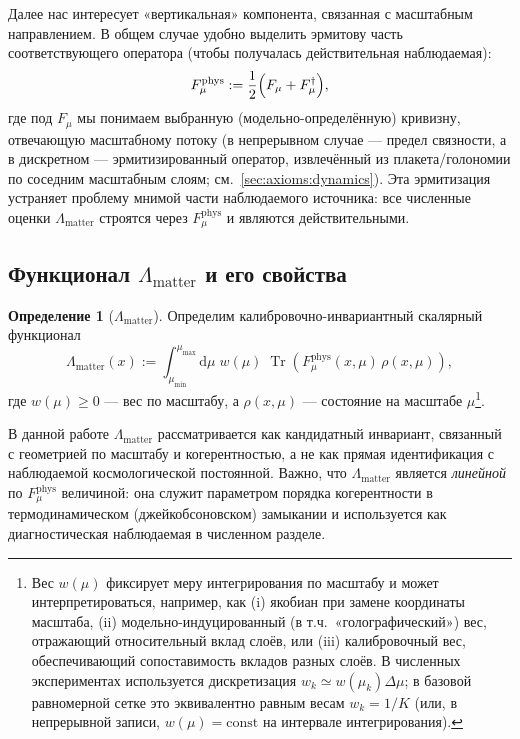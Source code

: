 \documentclass[11pt,a4paper]{article}
\DeclareMathOperator{\Tr}{Tr}
\newcommand{\dd}{\mathrm{d}}
\theoremstyle{definition}
\newtheorem{definition}{Определение}[section]
\theoremstyle{plain}
\theoremstyle{remark}
\begin{document}
Далее нас интересует «вертикальная» компонента, связанная с масштабным направлением.
В общем случае удобно выделить эрмитову часть соответствующего оператора (чтобы получалась действительная наблюдаемая):
\begin{equation}\label{eq:Fphys_def}
F_{\mu}^{\mathrm{phys}} := \frac{1}{2}\Bigl(F_{\mu}+F_{\mu}^\dagger\Bigr),
\end{equation}
где под $F_\mu$ мы понимаем выбранную (модельно-определённую) кривизну, отвечающую масштабному потоку
(в непрерывном случае --- предел связности, а в дискретном --- эрмитизированный оператор,
извлечённый из плакета/голономии по соседним масштабным слоям; см.\ \cref{sec:axioms:dynamics}).
Эта эрмитизация устраняет проблему мнимой части наблюдаемого источника:
все численные оценки $\Lambda_{\mathrm{matter}}$ строятся через $F_{\mu}^{\mathrm{phys}}$ и являются действительными.

\subsection[Функционал Lambda\_matter и его свойства]{Функционал $\Lambda_{\mathrm{matter}}$ и его свойства}
\label{sec:theory:Lambdadef}

\begin{definition}[$\Lambda_{\mathrm{matter}}$]\label{def:Lambdamatter}
Определим калибровочно-инвариантный скалярный функционал
\begin{equation}\label{eq:Lambdamatter_def}
\Lambda_{\mathrm{matter}}(x)
:=
\int_{\mu_{\min}}^{\mu_{\max}} \dd\mu\; w(\mu)\;
\Tr\!\left(F_{\mu}^{\mathrm{phys}}(x,\mu)\,\rho(x,\mu)\right),
\end{equation}
где $w(\mu)\ge 0$ — вес по масштабу, а $\rho(x,\mu)$ — состояние на масштабе $\mu$\footnote{Вес $w(\mu)$ фиксирует меру интегрирования по масштабу и может интерпретироваться, например, как (i) якобиан при замене координаты масштаба, (ii) модельно-индуцированный (в т.ч.\ «голографический») вес, отражающий относительный вклад слоёв, или (iii) калибровочный вес, обеспечивающий сопоставимость вкладов разных слоёв. В численных экспериментах используется дискретизация $w_k\simeq w(\mu_k)\Delta\mu$; в базовой равномерной сетке это эквивалентно равным весам $w_k=1/K$ (или, в непрерывной записи, $w(\mu)=\mathrm{const}$ на интервале интегрирования).}.
\end{definition}

В данной работе $\Lambda_{\mathrm{matter}}$ рассматривается как кандидатный инвариант, связанный с геометрией по масштабу и когерентностью, а не как прямая идентификация с наблюдаемой космологической постоянной.
Важно, что $\Lambda_{\mathrm{matter}}$ является \emph{линейной} по $F_\mu^{\mathrm{phys}}$ величиной:
она служит параметром порядка когерентности в термодинамическом (джейкобсоновском) замыкании
и используется как диагностическая наблюдаемая в численном разделе.
\end{document}

